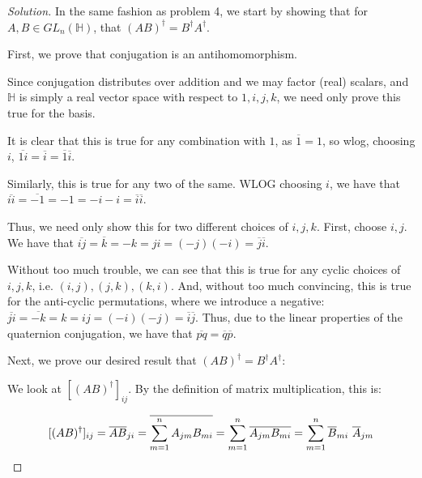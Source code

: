 \documentclass[10pt]{article}
\begin{document}
\begin{proof}[Solution]

In the same fashion as problem 4, we start by showing that for $A, B \in GL_n(\mathbb{H})$, that $(AB)^\dag = B^\dag A^\dag$.

First, we prove that conjugation is an antihomomorphism.






Since conjugation distributes over addition and we may factor (real) scalars, and $\mathbb{H}$ is simply a real vector space with respect to $1, i, j, k$, we need only prove this true for the basis.

It is clear that this is true for any combination with $1$, as $\overline{1} = 1$, so wlog, choosing $i$, $\overline{1i} = \overline{i} = \overline{1}\overline{i}$.

Similarly, this is true for any two of the same. WLOG choosing $i$, we have that $\overline{ii} = \overline{-1} = -1 = -i -i = \overline{i}\overline{i}$.

Thus, we need only show this for two different choices of $i,j,k$. First, choose $i,j$. We have that $\overline{ij} = \overline{k} = -k = ji = (-j)(-i) = \overline{j}\overline{i}$.

Without too much trouble, we can see that this is true for any cyclic choices of $i,j,k$, i.e. $(i,j), (j,k), (k,i)$. And, without too much convincing, this is true for the anti-cyclic permutations, where we introduce a negative: $\overline{ji} = \overline{-k} = k = ij = (-i)(-j) = \overline{i}\overline{j}$. Thus, due to the linear properties of the quaternion conjugation, we have that $\overline{pq} = \overline{q}\overline{p}$.

Next, we prove our desired result that $(AB)^\dag = B^\dag A^\dag$:

We look at $[(AB)^\dag]_{ij}$. By the definition of matrix multiplication, this is:

$$[(AB)^\dag]_{ij} = \overline{AB}_{ji} = \overline{\sum_{m=1}^n A_{jm}B_{mi} } = \sum_{m=1}^n \overline{A_{jm}B_{mi}} = \sum_{m=1}^n \overline{B}_{mi} \nobreakspace \overline{A}_{jm}$$


\end{proof}
\end{document}
